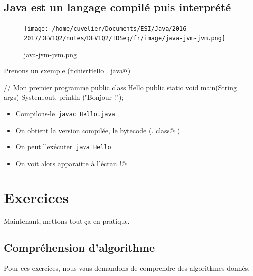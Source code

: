\documentclass[11pt,a4paper]{article}
\begin{document}
            \par
        \subsection{Java est un langage compil\'e puis interpr\'et\'e}\begin{figure}[hbt]
				    \begin{center}
					\texttt{[image: /home/cuvelier/Documents/ESI/Java/2016-2017/DEV1Q2/notes/DEV1Q2/TDSeq/fr/image/java-jvm-jvm.png]}
						\end{center}
                
                    \caption[java-jvm-jvm.png]{java-jvm-jvm.png}
                \end{figure}
                    
            \par
        
          Prenons un exemple (fichier\verb@ Hello . java@)
          
            \par
        \begin{Java}
// Mon premier programme
public class Hello {
    public static void main(String [] args) {
        System.out. println ("Bonjour !");
    }
}
        \end{Java}
					\begin{itemize}
				
			\item Compilons-le \,\verb|javac Hello.java|\,
			\item On obtient la version compil\'ee, le bytecode (\verb@Hello . class@ )
			\item On peut l'ex\'ecuter \,\verb|java Hello|\,
			\item On voit alors apparaitre \`a l'\'ecran \verb@Bonjour !@
					\end{itemize}
				
            \par
        \section{Exercices}
				Maintenant, mettons tout \c ca en pratique.
      
            \par
        \subsection{Compr\'ehension d'algorithme}
          Pour ces exercices, nous vous demandons de comprendre des algorithmes donn\'es. 
          
\end{document}
